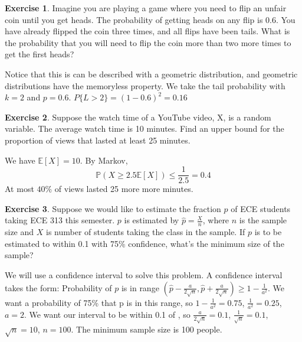 \documentclass[12pt]{amsart}
\theoremstyle{definition}
\newtheorem{exercise}{Exercise}
\numberwithin{equation}{section}
\theoremstyle{plain}
\newcommand{\E}{\mathbb{E}}
\renewcommand{\P}{\mathbb{P}}
\begin{document}
 
\begin{exercise}
    Imagine you are playing a game where you need to flip an unfair coin until you get heads. The probability of getting heads on any flip is 0.6. You have already flipped the coin three times, and all flips have been tails. What is the probability that you will need to flip the coin more than two more times to get the first heads? %
    \begin{answer}
    Notice that this is can be described with a geometric distribution, and geometric distributions have the memoryless property. We take the tail probability with $k = 2$ and $p = 0.6$. 
    \newline
    $P\{L > 2\} = (1 - 0.6)^2 = 0.16$
    \end{answer}
\end{exercise}

 
\begin{exercise}
    Suppose the watch time of a YouTube video, X, is a random variable. The average watch time is 10 minutes. Find an upper bound for the proportion of views that lasted at least 25 minutes. %
    \begin{answer}
        We have $\E[X] = 10$. By Markov,
        \[
            \P(X \geq 2.5\E[X]) \leq \frac{1}{2.5} = 0.4
        \]
        At most $40\%$ of views lasted 25 more more minutes.
    \end{answer}
\end{exercise}

 

\begin{exercise}
    Suppose we would like to estimate the fraction $p$ of ECE students taking ECE 313 this semester. $p$ is estimated by $\widehat{p}=\frac{X}{n}$, where $n$ is the sample size and $X$ is number of students taking the class in the sample. If $p$ is to be estimated to within 0.1 with 75\% confidence, what’s the minimum size of the sample? %
\end{exercise}
\begin{answer}
    We will use a confidence interval to solve this problem. A confidence interval takes the form: Probability of $p$ is in range $(\hat{p} - \frac{a}{2\sqrt{n}}, \hat{p} + \frac{a}{2\sqrt{n}}) \geq 1 - \frac{1}{a^2}$. We want a probability of 75\% that p is in this range, so $1 - \frac{1}{a^2} = 0.75$, $\frac{1}{a^2} = 0.25$, $a = 2$. We want our interval to be within 0.1 of , so $\frac{a}{2\sqrt{n}} = 0.1$, $\frac{1}{\sqrt{n}} = 0.1$, $\sqrt{n} = 10$, $n = 100$. The minimum sample size is 100 people.
\end{answer}
\end{document}
